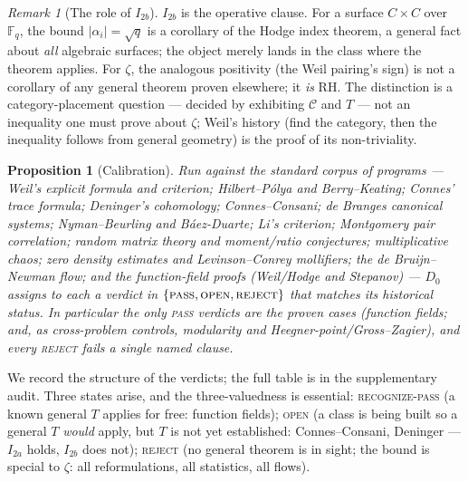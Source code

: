 \documentclass[11pt]{amsart}
\newtheorem{proposition}[theorem]{Proposition}
\theoremstyle{definition}
\theoremstyle{remark}
\newtheorem{remark}[theorem]{Remark}
\newcommand{\bbF}{\mathbb{F}}
\begin{document}
\begin{remark}[The role of $I_{2b}$]
$I_{2b}$ is the operative clause. For a surface $C\times C$ over $\bbF_q$, the
bound $|\alpha_i|=\sqrt q$ is a corollary of the Hodge index theorem, a general
fact about \emph{all} algebraic surfaces; the object merely lands in the class
where the theorem applies. For $\zeta$, the analogous positivity (the Weil
pairing's sign) is not a corollary of any general theorem proven elsewhere; it
\emph{is} RH. The distinction is a category-placement question --- decided by
exhibiting $\mathcal C$ and $T$ --- not an inequality one must prove about
$\zeta$; Weil's history (find the category, then the inequality follows from
general geometry) is the proof of its non-triviality.
\end{remark}

\begin{proposition}[Calibration]\label{prop:cal}
Run against the standard corpus of programs --- Weil's explicit formula and
criterion; Hilbert--P\'olya and Berry--Keating; Connes' trace formula;
Deninger's cohomology; Connes--Consani; de Branges canonical systems;
Nyman--Beurling and B\'aez-Duarte; Li's criterion; Montgomery pair correlation;
random matrix theory and moment/ratio conjectures; multiplicative chaos; zero
density estimates and Levinson--Conrey mollifiers; the de Bruijn--Newman flow;
and the function-field proofs (Weil/Hodge and Stepanov) --- $D_0$ assigns to
each a verdict in $\{\textsc{pass},\textsc{open},\textsc{reject}\}$ that matches
its historical status. In particular the only \textsc{pass} verdicts are the
\emph{proven} cases (function fields; and, as cross-problem controls,
modularity and Heegner-point/Gross--Zagier), and every \textsc{reject} fails a
single named clause.
\end{proposition}

We record the structure of the verdicts; the full table is in the supplementary
audit. Three states arise, and the three-valuedness is essential:
\textsc{recognize-pass} (a known general $T$ applies for free: function fields);
\textsc{open} (a class is being built so a general $T$ \emph{would} apply, but
$T$ is not yet established: Connes--Consani, Deninger --- $I_{2a}$ holds,
$I_{2b}$ does not); \textsc{reject} (no general theorem is in sight; the bound
is special to $\zeta$: all reformulations, all statistics, all flows).
\end{document}
